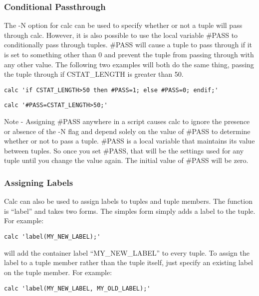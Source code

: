 \documentclass[11pt]{article}
\begin{document}
\subsubsection {Conditional Passthrough}

The -N option for calc can be used to specify whether or not a tuple will pass through calc.
However, it is also possible to use the local variable \#PASS to conditionally pass through tuples.
\#PASS will cause a tuple to pass through if it is set to something other than 0 and prevent the
tuple from passing through with any other value.  The following two examples will both do the same thing,
passing the tuple through if CSTAT\_LENGTH is greater than 50.

\begin{lstlisting}
calc 'if CSTAT_LENGTH>50 then #PASS=1; else #PASS=0; endif;'
\end{lstlisting}

\begin{lstlisting}
calc '#PASS=CSTAT_LENGTH>50;'
\end{lstlisting}

Note - Assigning \#PASS anywhere in a script causes calc to ignore the presence or absence of the
-N flag and depend solely on the value of \#PASS to determine whether or not to pass a tuple.
\#PASS is a local variable that maintains its value between tuples.  So once you set \#PASS, that will be
the settings used for any tuple until you change the value again.  The initial value of \#PASS will be
zero.


\subsubsection {Assigning Labels}

Calc can also be used to assign labels to tuples and tuple members.
The function is ``label'' and takes two forms.  The simples form
simply adds a label to the tuple.  For example:

\begin{lstlisting}
calc 'label(MY_NEW_LABEL);'
\end{lstlisting}

will add the container label ``MY\_NEW\_LABEL'' to every tuple.  To assign the
label to a tuple member rather than the tuple itself, just specify an
existing label on the tuple member.  For example:

\begin{lstlisting}
calc 'label(MY_NEW_LABEL, MY_OLD_LABEL);'
\end{lstlisting}
\end{document}
